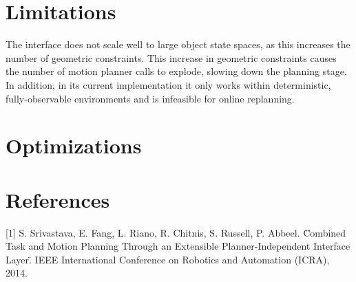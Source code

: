 \documentclass[12pt]{article}
\begin{document}
\section{Limitations}

The interface does not scale well to large object state spaces, as this increases the number of geometric constraints. 
This increase in geometric constraints causes the number of motion planner calls to explode, slowing down the planning stage. 
In addition, in its current implementation it only works within deterministic, fully-observable environments and is infeasible for online replanning.

\section{Optimizations}

\section{References}

[1] S. Srivastava, E. Fang, L. Riano, R. Chitnis, S. Russell, P. Abbeel. \"Combined Task and Motion Planning Through an Extensible Planner-Independent Interface Layer\". IEEE International Conference on Robotics and Automation (ICRA), 2014.
\end{document}
